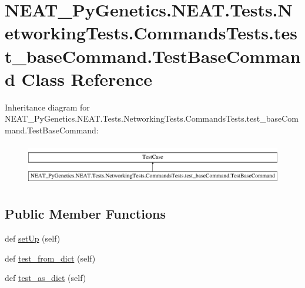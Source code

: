 \hypertarget{classNEAT__PyGenetics_1_1NEAT_1_1Tests_1_1NetworkingTests_1_1CommandsTests_1_1test__baseCommand_1_1TestBaseCommand}{}\section{N\+E\+A\+T\+\_\+\+Py\+Genetics.\+N\+E\+A\+T.\+Tests.\+Networking\+Tests.\+Commands\+Tests.\+test\+\_\+base\+Command.\+Test\+Base\+Command Class Reference}
\label{classNEAT__PyGenetics_1_1NEAT_1_1Tests_1_1NetworkingTests_1_1CommandsTests_1_1test__baseCommand_1_1TestBaseCommand}
Inheritance diagram for N\+E\+A\+T\+\_\+\+Py\+Genetics.\+N\+E\+A\+T.\+Tests.\+Networking\+Tests.\+Commands\+Tests.\+test\+\_\+base\+Command.\+Test\+Base\+Command\+:\begin{figure}[H]
\begin{center}
\leavevmode
\includegraphics[height=1.848185cm]{classNEAT__PyGenetics_1_1NEAT_1_1Tests_1_1NetworkingTests_1_1CommandsTests_1_1test__baseCommand_1_1TestBaseCommand}
\end{center}
\end{figure}
\subsection*{Public Member Functions}
\begin{DoxyCompactItemize}
\item 
def \hyperlink{classNEAT__PyGenetics_1_1NEAT_1_1Tests_1_1NetworkingTests_1_1CommandsTests_1_1test__baseCommand_1_1TestBaseCommand_a9ea4f680b4693d49bf455f5f18ec3bff}{set\+Up} (self)
\item 
def \hyperlink{classNEAT__PyGenetics_1_1NEAT_1_1Tests_1_1NetworkingTests_1_1CommandsTests_1_1test__baseCommand_1_1TestBaseCommand_a7bbe5cd48c3e660972de4ef350395ef0}{test\+\_\+from\+\_\+dict} (self)
\item 
def \hyperlink{classNEAT__PyGenetics_1_1NEAT_1_1Tests_1_1NetworkingTests_1_1CommandsTests_1_1test__baseCommand_1_1TestBaseCommand_ad1ba157afd92a7ae452aad4680392eed}{test\+\_\+as\+\_\+dict} (self)
\end{DoxyCompactItemize}
